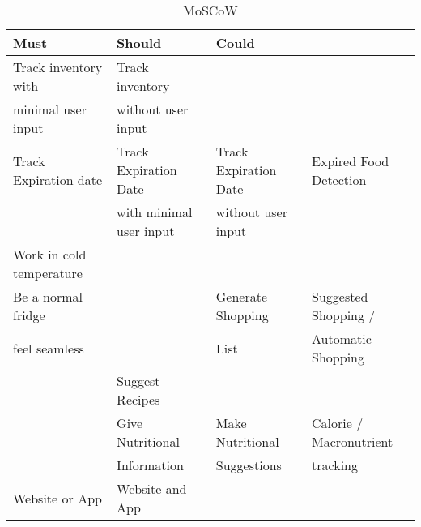 \begin{table}[H]
    \centering
    \small
    \caption{MoSCoW}
    \label{tab:mscw}
    \begin{tabular}{|l|l|l|l|}
    \hline
    \cellcolor[HTML]{9AFF99}\textbf{Must} &
      \cellcolor[HTML]{FFFC9E}\textbf{Should} &
      \cellcolor[HTML]{FFCE93}\textbf{Could} &
      \cellcolor[HTML]{FD6864}{\color[HTML]{000000} \textbf{Wont}} \\ \hline
    Track inventory with     & Track inventory         &                    &                         \\
    minimal user input       & without user input      &                    &                         \\ \hline
    Track Expiration date &
      Track Expiration Date &
      Track Expiration Date &
      Expired Food Detection \\
                             & with minimal user input & without user input &                         \\ \hline
    Work in cold temperature &                         &                    &                         \\ \hline
    Be a normal fridge       &                         & Generate Shopping  & Suggested Shopping /    \\
    feel seamless            &                         & List               & Automatic Shopping      \\ \hline
                             & Suggest Recipes         &                    &                         \\ \hline
                             & Give Nutritional        & Make Nutritional   & Calorie / Macronutrient \\
                             & Information             & Suggestions        & tracking                \\ \hline
    Website or App           & Website and App         &                    &                         \\ \hline
    \end{tabular}
\end{table}
